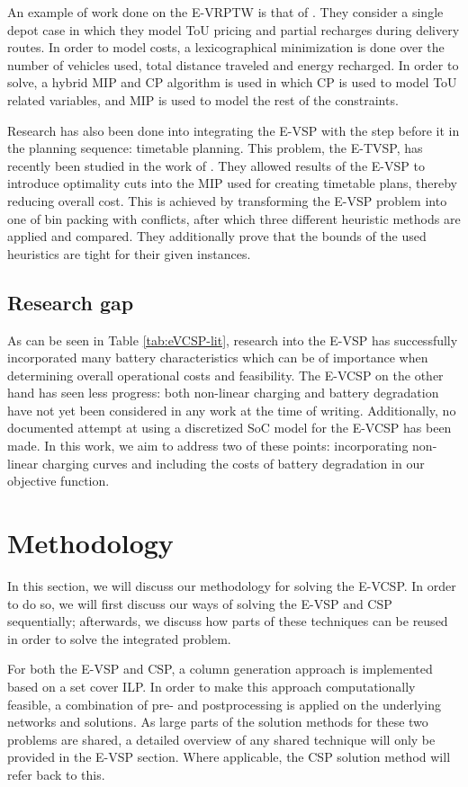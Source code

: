 \documentclass[]{article}
\begin{document}
An example of work done on the E-VRPTW is that of \citet{Ham2021}. They consider a single depot case in which they model ToU pricing and partial recharges during delivery routes. In order to model costs, a lexicographical minimization is done over the number of vehicles used, total distance traveled and energy recharged. In order to solve, a hybrid MIP and CP algorithm is used in which CP is used to model ToU related variables, and MIP is used to model the rest of the constraints.

Research has also been done into integrating the E-VSP with the step before it in the planning sequence: timetable planning. This problem, the E-TVSP, has recently been studied in the work of \citet{Stadnichuk2024}. They allowed results of the E-VSP to introduce optimality cuts into the MIP used for creating timetable plans, thereby reducing overall cost. This is achieved by transforming the E-VSP problem into one of bin packing with conflicts, after which three different heuristic methods are applied and compared. They additionally prove that the bounds of the used heuristics are tight for their given instances. 

\subsection{Research gap}
As can be seen in Table \ref{tab:eVCSP-lit}, research into the E-VSP has successfully incorporated many battery characteristics which can be of importance when determining overall operational costs and feasibility. The E-VCSP on the other hand has seen less progress: both non-linear charging and battery degradation have not yet been considered in any work at the time of writing. Additionally, no documented attempt at using a discretized SoC model for the E-VCSP has been made. In this work, we aim to address two of these points: incorporating non-linear charging curves and including the costs of battery degradation in our objective function. 

\section{Methodology}
In this section, we will discuss our methodology for solving the E-VCSP. In order to do so, we will first discuss our ways of solving the E-VSP and CSP sequentially; afterwards, we discuss how parts of these techniques can be reused in order to solve the integrated problem.

For both the E-VSP and CSP, a column generation approach is implemented based on a set cover ILP. In order to make this approach computationally feasible, a combination of pre- and postprocessing is applied on the underlying networks and solutions. As large parts of the solution methods for these two problems are shared, a detailed overview of any shared technique will only be provided in the E-VSP section. Where applicable, the CSP solution method will refer back to this. 
\end{document}
